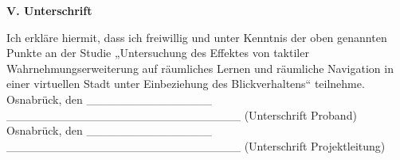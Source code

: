 \begin{center}
	\large{\textbf{V. Unterschrift}} \\
\end{center}


Ich erkläre hiermit, dass ich freiwillig und unter Kenntnis der oben genannten Punkte an der Studie „Untersuchung des Effektes von taktiler Wahrnehmungserweiterung auf räumliches Lernen und räumliche Navigation in einer virtuellen Stadt unter Einbeziehung des Blickverhaltens“ teilnehme. \\


Osnabrück, den \_\_\_\_\_\_\_\_\_\_\_\_\_\_\_  \_\_\_\_\_\_\_\_\_\_\_\_\_\_\_\_\_\_\_\_\_\_\_\_\_\_\_\_ (Unterschrift Proband) \\


Osnabrück, den \_\_\_\_\_\_\_\_\_\_\_\_\_\_\_ \_\_\_\_\_\_\_\_\_\_\_\_\_\_\_\_\_\_\_\_\_\_\_\_\_\_\_\_ (Unterschrift Projektleitung)

